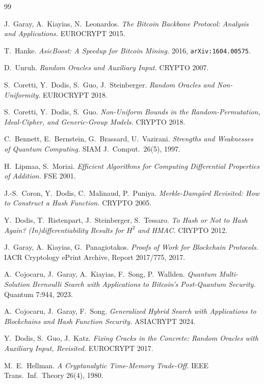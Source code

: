 \documentclass[11pt]{article}
\theoremstyle{remark}
\begin{document}
\begin{thebibliography}{99}

J.~Garay, A.~Kiayias, N.~Leonardos.
\emph{The Bitcoin Backbone Protocol: Analysis and Applications.}
EUROCRYPT 2015.

T.~Hanke.
\emph{AsicBoost: A Speedup for Bitcoin Mining.}
2016, \texttt{arXiv:1604.00575}.

D.~Unruh.
\emph{Random Oracles and Auxiliary Input.}
CRYPTO 2007.

S.~Coretti, Y.~Dodis, S.~Guo, J.~Steinberger.
\emph{Random Oracles and Non-Uniformity.}
EUROCRYPT 2018.

S.~Coretti, Y.~Dodis, S.~Guo.
\emph{Non-Uniform Bounds in the Random-Permutation, Ideal-Cipher, and
Generic-Group Models.}
CRYPTO 2018.

C.~Bennett, E.~Bernstein, G.~Brassard, U.~Vazirani.
\emph{Strengths and Weaknesses of Quantum Computing.}
SIAM J.\ Comput.\ 26(5), 1997.

H.~Lipmaa, S.~Moriai.
\emph{Efficient Algorithms for Computing Differential Properties of
Addition.}
FSE 2001.

J.-S.~Coron, Y.~Dodis, C.~Malinaud, P.~Puniya.
\emph{Merkle-Damg\aa rd Revisited: How to Construct a Hash Function.}
CRYPTO 2005.

Y.~Dodis, T.~Ristenpart, J.~Steinberger, S.~Tessaro.
\emph{To Hash or Not to Hash Again? (In)differentiability Results for
$H^2$ and HMAC.}
CRYPTO 2012.

J.~Garay, A.~Kiayias, G.~Panagiotakos.
\emph{Proofs of Work for Blockchain Protocols.}
IACR Cryptology ePrint Archive, Report 2017/775, 2017.

A.~Cojocaru, J.~Garay, A.~Kiayias, F.~Song, P.~Wallden.
\emph{Quantum Multi-Solution Bernoulli Search with Applications to
Bitcoin's Post-Quantum Security.}
Quantum 7:944, 2023.

A.~Cojocaru, J.~Garay, F.~Song.
\emph{Generalized Hybrid Search with Applications to Blockchains and Hash
Function Security.}
ASIACRYPT 2024.

Y.~Dodis, S.~Guo, J.~Katz.
\emph{Fixing Cracks in the Concrete: Random Oracles with Auxiliary Input,
Revisited.}
EUROCRYPT 2017.

M.~E.~Hellman.
\emph{A Cryptanalytic Time-Memory Trade-Off.}
IEEE Trans.\ Inf.\ Theory 26(4), 1980.


\end{thebibliography}
\end{document}
